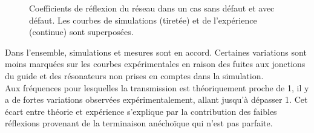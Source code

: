 \begin{figure}[!h]
	\centering
\caption{\label{ref_reflexion1} Coefficients de réflexion du réseau dans un cas sans défaut et avec défaut. Les courbes de simulations (tiretée) et de l’expérience (continue) sont superposées.}
\end{figure}

Dans l'ensemble, simulations et mesures sont en accord. Certaines variations sont moins marquées sur les courbes expérimentales en raison des fuites aux jonctions du guide et des résonateurs non prises en comptes dans la simulation.\\
Aux fréquences pour lesquelles la transmission est théoriquement proche de 1, il y a de fortes variations observées expérimentalement, allant jusqu'à dépasser 1. Cet écart entre théorie et expérience s'explique par la contribution des faibles réflexions provenant de la terminaison anéchoïque qui n'est pas parfaite.\\~\\


